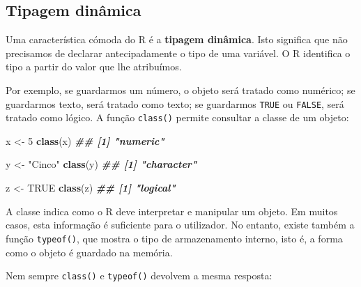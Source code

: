 \documentclass[
  portuguese,
  11pt,
  openany]{book}
\newenvironment{Shaded}{\begin{snugshade}}{\end{snugshade}}
\newcommand{\ConstantTok}[1]{\textcolor[rgb]{0.56,0.35,0.01}{#1}}
\newcommand{\DecValTok}[1]{\textcolor[rgb]{0.00,0.00,0.81}{#1}}
\newcommand{\DocumentationTok}[1]{\textcolor[rgb]{0.56,0.35,0.01}{\textbf{\textit{#1}}}}
\newcommand{\FunctionTok}[1]{\textcolor[rgb]{0.13,0.29,0.53}{\textbf{#1}}}
\newcommand{\NormalTok}[1]{#1}
\newcommand{\OtherTok}[1]{\textcolor[rgb]{0.56,0.35,0.01}{#1}}
\newcommand{\StringTok}[1]{\textcolor[rgb]{0.31,0.60,0.02}{#1}}
\begin{document}
\subsection{Tipagem dinâmica}\label{tipagem-dinuxe2mica}

Uma característica cómoda do R é a \textbf{tipagem dinâmica}. Isto significa que não precisamos de declarar antecipadamente o tipo de uma variável. O R identifica o tipo a partir do valor que lhe atribuímos.

Por exemplo, se guardarmos um número, o objeto será tratado como numérico; se guardarmos texto, será tratado como texto; se guardarmos \texttt{TRUE} ou \texttt{FALSE}, será tratado como lógico. A função \texttt{class()} permite consultar a classe de um objeto:

\begin{Shaded}
\begin{Highlighting}[]
\NormalTok{x }\OtherTok{\textless{}{-}} \DecValTok{5}
\FunctionTok{class}\NormalTok{(x)}
\DocumentationTok{\#\# [1] "numeric"}

\NormalTok{y }\OtherTok{\textless{}{-}} \StringTok{"Cinco"}
\FunctionTok{class}\NormalTok{(y)}
\DocumentationTok{\#\# [1] "character"}

\NormalTok{z }\OtherTok{\textless{}{-}} \ConstantTok{TRUE}
\FunctionTok{class}\NormalTok{(z)}
\DocumentationTok{\#\# [1] "logical"}
\end{Highlighting}
\end{Shaded}

A classe indica como o R deve interpretar e manipular um objeto. Em muitos casos, esta informação é suficiente para o utilizador. No entanto, existe também a função \texttt{typeof()}, que mostra o tipo de armazenamento interno, isto é, a forma como o objeto é guardado na memória.

Nem sempre \texttt{class()} e \texttt{typeof()} devolvem a mesma resposta:
\end{document}
